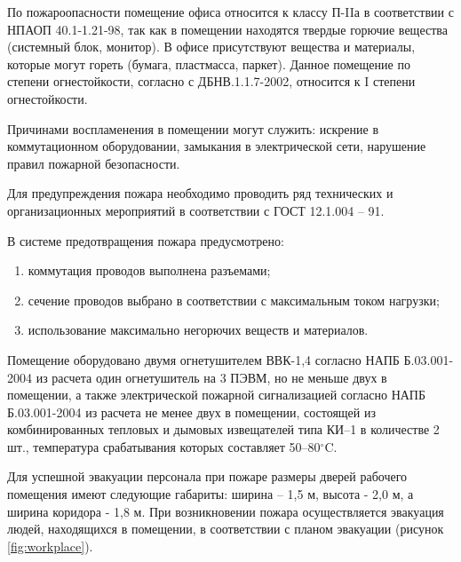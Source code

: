 По пожароопасности помещение офиса относится к классу П-IIа в соответствии с НПАОП 40.1-1.21-98, 
так как в помещении находятся твердые горючие вещества (системный блок, монитор). В офисе присутствуют 
вещества и материалы, которые могут гореть (бумага, пластмасса, паркет). Данное помещение по степени огнестойкости,
согласно с ДБНВ.1.1.7-2002, относится к I степени огнестойкости. 

Причинами воспламенения в помещении могут служить: искрение в коммутационном оборудовании, 
замыкания в электрической сети, нарушение правил пожарной безопасности. 

Для предупреждения пожара необходимо проводить ряд технических и организационных мероприятий в соответствии 
с ГОСТ 12.1.004 – 91.

В системе предотвращения пожара предусмотрено:

\begin{enumerate}
    \item коммутация проводов выполнена разъемами;
    \item сечение проводов выбрано в соответствии с максимальным током нагрузки;
    \item использование максимально негорючих веществ и материалов.
\end{enumerate}

Помещение оборудовано двумя огнетушителем ВВК-1,4 согласно НАПБ Б.03.001-2004  из расчета один огнетушитель на 3 ПЭВМ,
но не меньше двух в помещении, а также электрической пожарной сигнализацией согласно НАПБ Б.03.001-2004 из расчета 
не менее двух в помещении, состоящей из комбинированных тепловых и дымовых извещателей типа КИ–1 в количестве 2 шт.,
температура срабатывания которых составляет 50–80$^{\circ}\mathrm{C}$.

Для успешной эвакуации персонала при пожаре размеры дверей рабочего помещения имеют следующие габариты: 
ширина  – 1,5 м, высота -  2,0 м, а ширина коридора - 1,8 м.  При возникновении пожара осуществляется эвакуация людей, 
находящихся в помещении, в соответствии с планом эвакуации (рисунок \ref{fig:workplace}).

